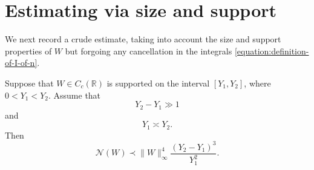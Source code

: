 \documentclass[reqno]{amsart} 
\begin{document}
\section{Estimating via size and support}
We next record a crude estimate, taking into account the size and support properties of $W$ but forgoing any cancellation in the integrals \eqref{equation:definition-of-I-of-n}.
\begin{lemma}\label{lemma:crude-bound}
  Suppose that $W \in C_c(\mathbb{R})$ is supported on the interval $[Y_1, Y_2]$, where $0 < Y_1 < Y_2$.  Assume that
  \begin{equation}\label{eqn:Y2-Y1-separated}
    Y_2 - Y_1 \gg 1
  \end{equation}
  and
  \begin{equation}\label{eqn:Y1-Y2-same-size}
    Y_1 \asymp Y_2.
  \end{equation}
  Then
  \begin{equation*}
    \mathcal{N}(W) \prec
    \lVert W \rVert_{\infty}^4 \frac{(Y_2 - Y_1)^3 }{Y_1^2}.
  \end{equation*}
\end{lemma}
\end{document}
